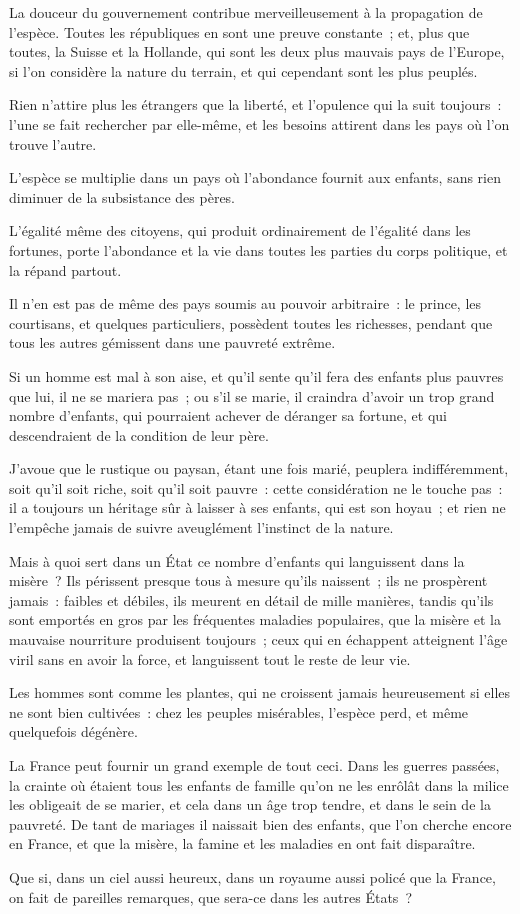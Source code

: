 \documentclass[french,twoside]{book} %
\begin{document}
\noindent La douceur du gouvernement contribue merveilleusement à la propagation de l’espèce. Toutes les républiques en sont une preuve constante ; et, plus que toutes, la Suisse et la Hollande, qui sont les deux plus mauvais pays de l’Europe, si l’on considère la nature du terrain, et qui cependant sont les plus peuplés.\par
Rien n’attire plus les étrangers que la liberté, et l’opulence qui la suit toujours : l’une se fait rechercher par elle-même, et les besoins attirent dans les pays où l’on trouve l’autre.\par
L’espèce se multiplie dans un pays où l’abondance fournit aux enfants, sans rien diminuer de la subsistance des pères.\par
L’égalité même des citoyens, qui produit ordinairement de l’égalité dans les fortunes, porte l’abondance et la vie dans toutes les parties du corps politique, et la répand partout.\par
Il n’en est pas de même des pays soumis au pouvoir arbitraire : le prince, les courtisans, et quelques particuliers, possèdent toutes les richesses, pendant que tous les autres gémissent dans une pauvreté extrême.\par
Si un homme est mal à son aise, et qu’il sente qu’il fera des enfants plus pauvres que lui, il ne se mariera pas ; ou s’il se marie, il craindra d’avoir un trop grand nombre d’enfants, qui pourraient achever de déranger sa fortune, et qui descendraient de la condition de leur père.\par
J’avoue que le rustique ou paysan, étant une fois marié, peuplera indifféremment, soit qu’il soit riche, soit qu’il soit pauvre : cette considération ne le touche pas : il a toujours un héritage sûr à laisser à ses enfants, qui est son hoyau ; et rien ne l’empêche jamais de suivre aveuglément l’instinct de la nature.\par
Mais à quoi sert dans un État ce nombre d’enfants qui languissent dans la misère ? Ils périssent presque tous à mesure qu’ils naissent ; ils ne prospèrent jamais : faibles et débiles, ils meurent en détail de mille manières, tandis qu’ils sont emportés en gros par les fréquentes maladies populaires, que la misère et la mauvaise nourriture produisent toujours ; ceux qui en échappent atteignent l’âge viril sans en avoir la force, et languissent tout le reste de leur vie.\par
Les hommes sont comme les plantes, qui ne croissent jamais heureusement si elles ne sont bien cultivées : chez les peuples misérables, l’espèce perd, et même quelquefois dégénère.\par
La France peut fournir un grand exemple de tout ceci. Dans les guerres passées, la crainte où étaient tous les enfants de famille qu’on ne les enrôlât dans la milice les obligeait de se marier, et cela dans un âge trop tendre, et dans le sein de la pauvreté. De tant de mariages il naissait bien des enfants, que l’on cherche encore en France, et que la misère, la famine et les maladies en ont fait disparaître.\par
Que si, dans un ciel aussi heureux, dans un royaume aussi policé que la France, on fait de pareilles remarques, que sera-ce dans les autres États ?\par
\end{document}
